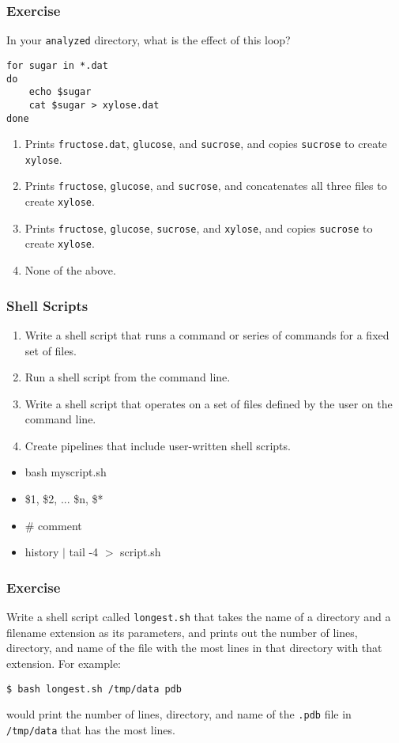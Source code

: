 \documentclass[xcolor=dvipsnames]{beamer}
\begin{document}
\begin{frame}[fragile]
\frametitle{Exercise}
In your {\tt analyzed} directory, what is the effect of this loop?

\begin{verbatim}
for sugar in *.dat
do
    echo $sugar
    cat $sugar > xylose.dat
done
\end{verbatim}
\begin{enumerate}
  \item Prints {\tt fructose.dat}, {\tt glucose}, and {\tt sucrose}, and copies {\tt sucrose} to create {\tt xylose}.
  \item Prints {\tt fructose}, {\tt glucose}, and {\tt sucrose}, and concatenates all three files to create {\tt xylose}.
  \item Prints {\tt fructose}, {\tt glucose}, {\tt sucrose}, and {\tt xylose}, and copies {\tt sucrose} to create {\tt xylose}.
  \item None of the above.
\end{enumerate}
\end{frame}


\begin{frame}
\frametitle{Shell Scripts}
\begin{enumerate}
\item Write a shell script that runs a command or series of commands for a fixed set of files.
\item Run a shell script from the command line.
\item Write a shell script that operates on a set of files defined by the user on the command line.
\item Create pipelines that include user-written shell scripts.
\end{enumerate}
\begin{multicols}{2}
\begin{itemize}
  \item bash myscript.sh
  \item \$1, \$2, ... \$n, \$*
  \item \# comment
  \item history $|$ tail -4 $>$ script.sh
\end{itemize}
\end{multicols}
\end{frame}


\begin{frame}[fragile]
\frametitle{Exercise}
Write a shell script called {\tt longest.sh} that takes the name of a directory and a filename extension as its parameters,
and prints out the number of lines,
directory,
and name of the file with the most lines in that directory with that extension.
For example:

\begin{verbatim}
$ bash longest.sh /tmp/data pdb
\end{verbatim}

would print the number of lines,
directory,
and name of the {\tt .pdb} file in {\tt /tmp/data} that has
the most lines.
\end{frame}
\end{document}
